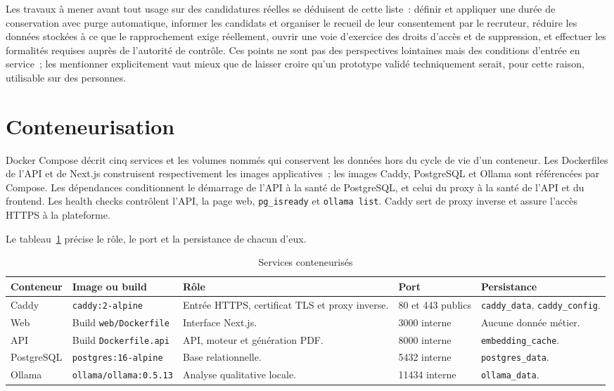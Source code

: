 Les travaux à mener avant tout usage sur des candidatures réelles se déduisent de cette liste~: définir et appliquer une durée de conservation avec purge automatique, informer les candidats et organiser le recueil de leur consentement par le recruteur, réduire les données stockées à ce que le rapprochement exige réellement, ouvrir une voie d'exercice des droits d'accès et de suppression, et effectuer les formalités requises auprès de l'autorité de contrôle. Ces points ne sont pas des perspectives lointaines mais des conditions d'entrée en service~; les mentionner explicitement vaut mieux que de laisser croire qu'un prototype validé techniquement serait, pour cette raison, utilisable sur des personnes.

\section{Conteneurisation}

Docker Compose décrit cinq services et les volumes nommés qui conservent les données hors du cycle de vie d'un conteneur. Les Dockerfiles de l'API et de Next.js construisent respectivement les images applicatives~; les images Caddy, PostgreSQL et Ollama sont référencées par Compose. Les dépendances conditionnent le démarrage de l'API à la santé de PostgreSQL, et celui du proxy à la santé de l'API et du frontend. Les health checks contrôlent l'API, la page web, \texttt{pg\_isready} et \texttt{ollama list}. Caddy sert de proxy inverse et assure l'accès HTTPS à la plateforme.

Le tableau~\ref{tab:chap6-containers} précise le rôle, le port et la persistance de chacun d'eux.

\begin{table}[H]
\centering
\small
\caption{Services conteneurisés}
\label{tab:chap6-containers}
\begin{tabularx}{\textwidth}{|p{}|p{}|X|p{}|p{}|}
\hline
\textbf{Conteneur} & \textbf{Image ou build} & \textbf{Rôle} & \textbf{Port} & \textbf{Persistance}\\
\hline
Caddy & \texttt{caddy:2-alpine} & Entrée HTTPS, certificat TLS et proxy inverse. & 80 et 443 publics & \texttt{caddy\_data}, \texttt{caddy\_config}.\\
\hline
Web & Build \texttt{web/Dockerfile} & Interface Next.js. & 3000 interne & Aucune donnée métier.\\
\hline
API & Build \texttt{Dockerfile.api} & API, moteur et génération PDF. & 8000 interne & \texttt{embedding\_cache}.\\
\hline
PostgreSQL & \texttt{postgres:16-alpine} & Base relationnelle. & 5432 interne & \texttt{postgres\_data}.\\
\hline
Ollama & \texttt{ollama/ollama:0.5.13} & Analyse qualitative locale. & 11434 interne & \texttt{ollama\_data}.\\
\hline
\end{tabularx}
\end{table}

